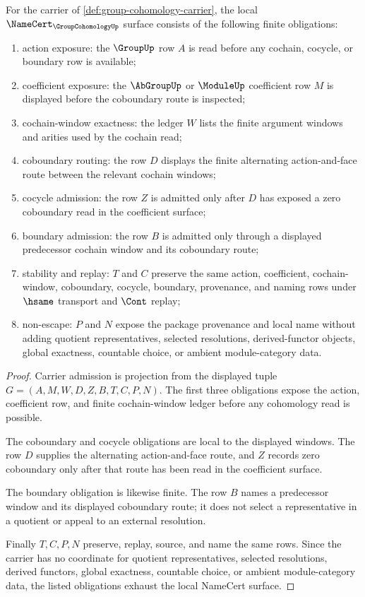 \begin{theorem}
\label{thm:group-cohomology-namecert-obligations}
For the carrier of \autoref{def:group-cohomology-carrier}, the local $\NameCert_{\GroupCohomologyUp}$ surface consists of the following finite obligations:
\begin{enumerate}
\item action exposure: the $\GroupUp$ row $A$ is read before any cochain, cocycle, or boundary row is available;
\item coefficient exposure: the $\AbGroupUp$ or $\ModuleUp$ coefficient row $M$ is displayed before the coboundary route is inspected;
\item cochain-window exactness: the ledger $W$ lists the finite argument windows and arities used by the cochain read;
\item coboundary routing: the row $D$ displays the finite alternating action-and-face route between the relevant cochain windows;
\item cocycle admission: the row $Z$ is admitted only after $D$ has exposed a zero coboundary read in the coefficient surface;
\item boundary admission: the row $B$ is admitted only through a displayed predecessor cochain window and its coboundary route;
\item stability and replay: $T$ and $C$ preserve the same action, coefficient, cochain-window, coboundary, cocycle, boundary, provenance, and naming rows under $\hsame$ transport and $\Cont$ replay;
\item non-escape: $P$ and $N$ expose the package provenance and local name without adding quotient representatives, selected resolutions, derived-functor objects, global exactness, countable choice, or ambient module-category data.
\end{enumerate}
\end{theorem}
\begin{proof}
Carrier admission is projection from the displayed tuple $G=(A,M,W,D,Z,B,T,C,P,N)$. The first three obligations expose the action, coefficient row, and finite cochain-window ledger before any cohomology read is possible.

The coboundary and cocycle obligations are local to the displayed windows. The row $D$ supplies the alternating action-and-face route, and $Z$ records zero coboundary only after that route has been read in the coefficient surface.

The boundary obligation is likewise finite. The row $B$ names a predecessor window and its displayed coboundary route; it does not select a representative in a quotient or appeal to an external resolution.

Finally $T,C,P,N$ preserve, replay, source, and name the same rows. Since the carrier has no coordinate for quotient representatives, selected resolutions, derived functors, global exactness, countable choice, or ambient module-category data, the listed obligations exhaust the local NameCert surface.
\end{proof}

